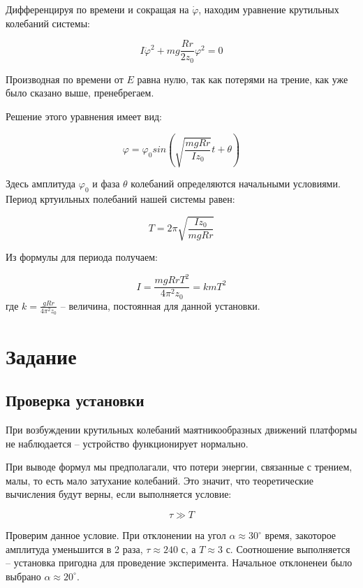 \documentclass[a4paper,12pt]{article}
\begin{document}
	Дифференцируя по времени и сокращая на $\dot\varphi$, находим уравнение крутильных колебаний системы:
	
	\begin{equation}
		I\ddot\varphi^2 + mg\frac{Rr}{2z_0}\varphi^2 = 0
	\end{equation}
		
	Производная по времени от $E$ равна нулю, так как потерями на трение, как уже было сказано выше, пренебрегаем.
	
	Решение этого уравнения имеет вид:
	
	\begin{equation}
		\varphi = \varphi_0 sin \left(\sqrt{\frac{mgRr}{Iz_0}}t + \theta\right)
	\end{equation}

	Здесь амплитуда $\varphi_0$ и фаза $\theta$ колебаний определяются начальными условиями. Период кртуильных полебаний нашей системы равен:
	
	\begin{equation}
		T = 2\pi \sqrt{\frac{Iz_0}{mgRr}}
	\end{equation}

	Из формулы для периода получаем:
	
	\begin{equation}\label{momin}
		I = \frac{mgRrT^2}{4 \pi^2z_0} = kmT^2
	\end{equation}
	\noindent где $k = \frac{gRr}{4\pi^2z_0}$ -- величина, постоянная для данной установки.
	
	\section{Задание}
	\subsection{Проверка установки}
	При возбуждении крутильных колебаний маятникообразных движений платформы не наблюдается -- устройство функционирует нормально.
	
	При выводе формул мы предполагали, что потери энергии, связанные с трением, малы, то есть мало затухание колебаний. Это значит, что теоретические вычисления будут верны, если выполняется условие:
	
	\begin{equation}
		\tau \gg T
	\end{equation}
	
	Проверим данное условие. При отклонении на угол $\alpha \approx 30^\circ$ время, закоторое амплитуда уменьшится в 2 раза, $\tau \approx 240\text{ с}$, а $T \approx 3\text{ с}$. Соотношение выполняется -- установка пригодна для проведение эксперимента. Начальное отклоненеи было выбрано $\alpha \approx 20^\circ$.
	
\end{document}
